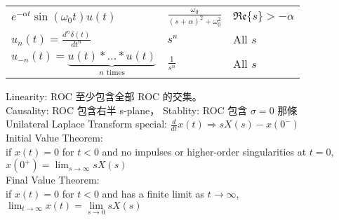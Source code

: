 \documentclass[10pt, a4paper, landscape]{article}
\theoremstyle{mystyle}	%
\begin{document}
\begin{minipage}{12cm}
\begin{tabu}{C{4cm}C{3cm}C{3cm}}
  $e^{-\alpha t} \sin(\omega_0 t)u(t)$ &
  $\displaystyle \frac{\omega_0}{(s+\alpha)^2 + \omega_0^2}$ &
  $\mathfrak{Re}\{s\} > -\alpha$ \\
  $\displaystyle u_n(t) = \frac{d^n\delta(t)}{dt^n}$ &
  $s^n$ & All $s$ \\
  $u_{-n}(t) = \underbrace{u(t) \ast \dots \ast u(t)}_\text{$n$ times}$ &
  $\displaystyle \frac{1}{s^n}$ & All $s$ \\
  \hline
\end{tabu}
Linearity: ROC 至少包含全部 ROC 的交集。\\
Causality: ROC 包含右半 s-plane，
Stablity: ROC 包含 $\sigma=0$ 那條 \\
Unilateral Laplace Transform special:
$\frac{d}{dt}x(t) \Rightarrow sX(s) - x(0^-)$ \\
Initial Value Theorem:\\
if $x(t) = 0$ for $t<0$ and no impulses or higher-order singularities
at $t=0$, \\
$x(0^+) = \lim_{s\to\infty} sX(s)$ \\ 
Final Value Theorem:\\
if $x(t) = 0$ for $t<0$ and has a finite limit
as $t \to \infty$, \\
$\lim_{t\to\infty}x(t) = \lim\limits_{s\to 0} sX(s)$
\end{minipage}
\end{document}

